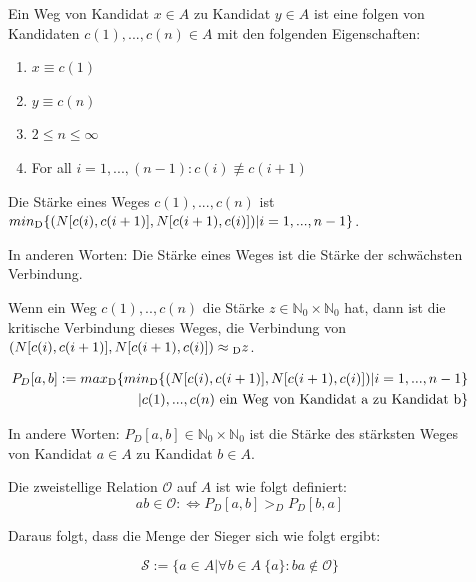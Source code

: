 \begin{description}
\item[]  Ein Weg von Kandidat $x \in A$ zu Kandidat $y \in A$ ist eine folgen von Kandidaten $c(1),...,c(n) \in A$ mit den folgenden Eigenschaften:

\begin{center}
\begin{enumerate}
\item $x \equiv c(1)$
\item $y \equiv c(n)$
\item $2 \leq n \leq \infty$
\item For all $ i = 1,...,(n-1): c(i) \not\equiv c(i+1)$
\end{enumerate}
\end{center}


\item[]
Die Stärke eines Weges $c(1),...,c(n)$ ist $ min\textsubscript{D} \{(N[c(i),c(i+1)],N[c(i+1),c(i)])| i=1,...,n-1\} $.

In anderen Worten: Die Stärke eines Weges ist die Stärke der schwächsten Verbindung.

\item[]
Wenn ein Weg $c(1),..,c(n)$ die Stärke $z \in  \mathbb{N}_{0} \times \mathbb{N}_{0}$ hat, dann ist die kritische Verbindung dieses Weges, die Verbindung von  $(N[c(i),c(i+1)],N[c(i+1),c(i)]) \approx \textsubscript{D}z$.

\begin{align}
P_{D}[a,b] := max\textsubscript{D}\{ min\textsubscript{D} \{(N[c(i),c(i+1)],N[c(i+1),c(i)])| i=1,...,n-1\} \nonumber \\
     |c(1),...,c(n) \text{ ein Weg von Kandidat a zu Kandidat b}\} \nonumber
\end{align}

In andere Worten: $P_{D}[a,b] \in \mathbb{N}_{0} \times \mathbb{N}_{0}$ ist die Stärke des stärksten Weges von Kandidat $a \in A$ zu Kandidat $b \in A$.

\item[]Die zweistellige Relation $\mathcal{O}$ auf $A$ ist wie folgt definiert:
\[
ab \in \mathcal{O} : \Leftrightarrow P_{D}[a,b]>_{D}P_{D}[b,a]
\]
\item[] Daraus folgt, dass die Menge der Sieger sich wie folgt ergibt:

\[
\mathcal{S} := \{ a \in A | \forall b \in A \ \{a\}: ba \not\in \mathcal{O} \}
\]

\end{description}



